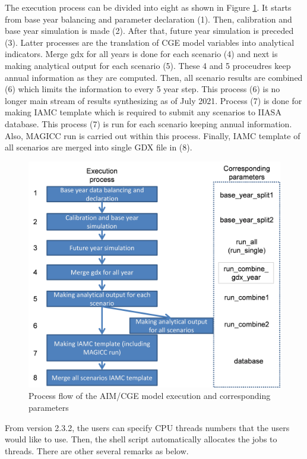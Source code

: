 \documentclass[10pt,a4paper,titlepage,dvipdfmx]{book}
\begin{document}
The execution process can be divided into eight as shown in Figure \ref{fig:ProcFlo}. It starts from base year balancing and parameter declaration (1). Then, calibration and base year simulation is made (2). After that, future year simulation is preceded (3). Latter processes are the translation of CGE model variables into analytical indicators. Merge gdx for all years is done for each scenario (4) and next is making analytical output for each scenario (5). These 4 and 5 proceudres keep annual information as they are computed. Then, all scenario results are combined (6) which limits the information to every 5 year step. This process (6) is no longer main stream of results synthesizing as of July 2021. Process (7) is done for making IAMC template which is required to submit any scenarios to IIASA database. This process (7) is run for each scenario keeping annual information. Also, MAGICC run is carried out within this process. Finally, IAMC template of all scenarios are merged into single GDX file in (8).
\begin{figure}
\includegraphics[width=1\textwidth]{fig/image13.png}
\caption{\label{ref-0070}Process flow of the AIM/CGE model execution and corresponding parameters}
\label{fig:ProcFlo}
\end{figure}
From version 2.3.2, the users can specify CPU threads numbers that the users would like to use. Then, the shell script automatically allocates the jobs to threads. There are other several remarks as below.
\end{document}
